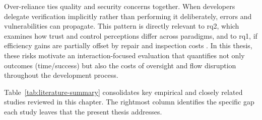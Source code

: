 Over-reliance ties quality and security concerns together. When developers delegate verification implicitly rather than performing it deliberately, errors and vulnerabilities can propagate. This pattern is directly relevant to \gls{rq2}, which examines how trust and control perceptions differ across paradigms, and to \gls{rq1}, if efficiency gains are partially offset by repair and inspection costs \parencite{mozannar2024reading, vaithilingam2022expectation}. In this thesis, these risks motivate an interaction-focused evaluation that quantifies not only outcomes (time/success) but also the costs of oversight and flow disruption throughout the development process.

Table~\ref{tab:literature-summary} consolidates key empirical and closely related studies reviewed in this chapter. The rightmost column identifies the specific gap each study leaves that the present thesis addresses.

